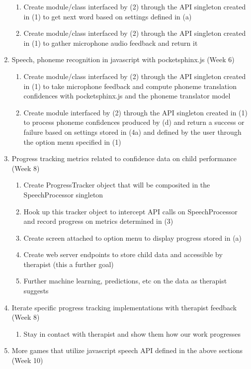\documentclass{article}
\begin{document}
\begin{enumerate}
\begin{enumerate}
        \item Create module/class interfaced by (2) through the API singleton created in (1) to get next word based on settings defined in (a)
        \item Create module/class interfaced by (2) through the API singleton created in (1) to gather microphone audio feedback and return it
    \end{enumerate}
    \item Speech, phoneme recognition in javascript with pocketsphinx.js (Week 6)
    \begin{enumerate}
        \item Create module/class interfaced by (2) through the API singleton created in (1) to take microphone feedback and compute phoneme translation confidences with pocketsphinx.js and the phoneme translator model
        \item Create module interfaced by (2) through the API singleton created in (1) to process phoneme confidences produced by (d) and return a success or failure based on settings stored in (4a) and defined by the user through the option menu specified in (1)
    \end{enumerate}
    \item Progress tracking metrics related to confidence data on child performance (Week 8)
    \begin{enumerate}
        \item Create ProgressTracker object that will be composited in the SpeechProcessor singleton
        \item Hook up this tracker object to intercept API calls on SpeechProcessor and record progress on metrics determined in (3)
        \item Create screen attached to option menu to display progress stored in (a)
        \item Create web server endpoints to store child data and accessible by therapist (this a further goal)
        \item Further machine learning, predictions, etc on the data as therapist suggests
    \end{enumerate}
    \item Iterate specific progress tracking implementations with therapist feedback (Week 8)
    \begin{enumerate}
        \item Stay in contact with therapist and show them how our work progresses
    \end{enumerate}
    \item More games that utilize javascript speech API defined in the above sections (Week 10)

\end{enumerate}
\end{document}

